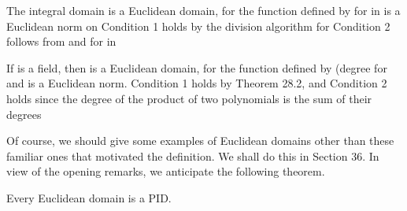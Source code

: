 \documentclass[11pt,oneside]{article}
\begin{document}
\begin{BookBody}
 The integral domain  is a Euclidean domain, for the function \BookInline{\nu } defined by  for  in  is a Euclidean norm on  Condition 1 holds by the division algorithm for  Condition 2 follows from  and  for  in \BookEnd{\blacktriangle}

 If  is a field, then  is a Euclidean domain, for the function \BookInline{\nu } defined by  (degree  for  and  is a Euclidean norm. Condition 1 holds by Theorem 28.2, and Condition 2 holds since the degree of the product of two polynomials is the sum of their degrees\BookEnd{\blacktriangle}

Of course, we should give some examples of Euclidean domains other than these familiar ones that motivated the definition. We shall do this in Section 36. In view of the opening remarks, we anticipate the following theorem.

 Every Euclidean domain is a PID.

\end{BookBody}

\BookNarrativetrue
\end{document}
